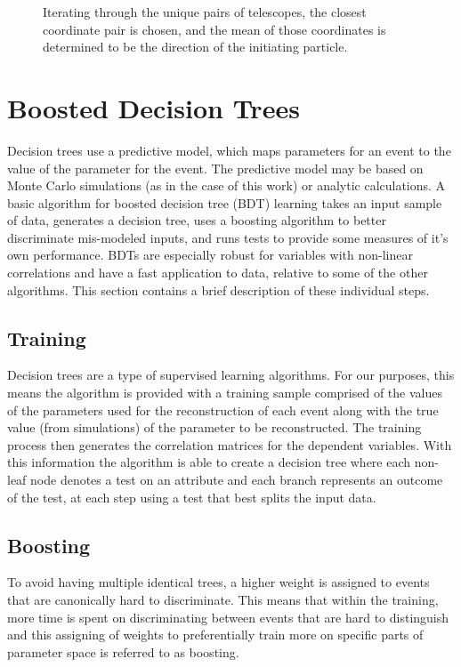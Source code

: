 \documentclass[main.tex]{subfiles}
\begin{document}
\begin{figure}[htbp]
{}
  \caption[Combining multiple telescopes in \disp reconstruction]{Iterating through the unique pairs of telescopes, the closest coordinate pair is chosen, and the mean of those coordinates is determined to be the direction of the initiating particle.}
  \label{fig:head_tail}
\end{figure}


\section{Boosted Decision Trees}
Decision trees use a predictive model, which maps parameters for an event to the value of the \disp parameter for the event. The predictive model may be based on Monte Carlo simulations (as in the case of this work) or analytic calculations. A basic algorithm for boosted decision tree (BDT) learning takes an input sample of data, generates a decision tree, uses a boosting algorithm to better discriminate mis-modeled inputs, and runs tests to provide some measures of it's own performance. BDTs are especially robust for variables with non-linear correlations and have a fast application to data, relative to some of the other algorithms. This section contains a brief description of these individual steps.

\subsection{Training}
Decision trees are a type of supervised learning algorithms. For our purposes, this means the algorithm is provided with a training sample comprised of the values of the parameters used for the reconstruction of each event along with the true value (from simulations) of the parameter to be reconstructed. The training process then generates the correlation matrices for the dependent variables. With this information the algorithm is able to create a decision tree where each non-leaf node denotes a test on an attribute and each branch represents an outcome of the test, at each step using a test that best splits the input data.

\subsection{Boosting}
To avoid having multiple identical trees, a higher weight is assigned to events that are canonically hard to discriminate. This means that within the training, more time is spent on discriminating between events that are hard to distinguish and this assigning of weights to preferentially train more on specific parts of parameter space is referred to as boosting.
\end{document}
